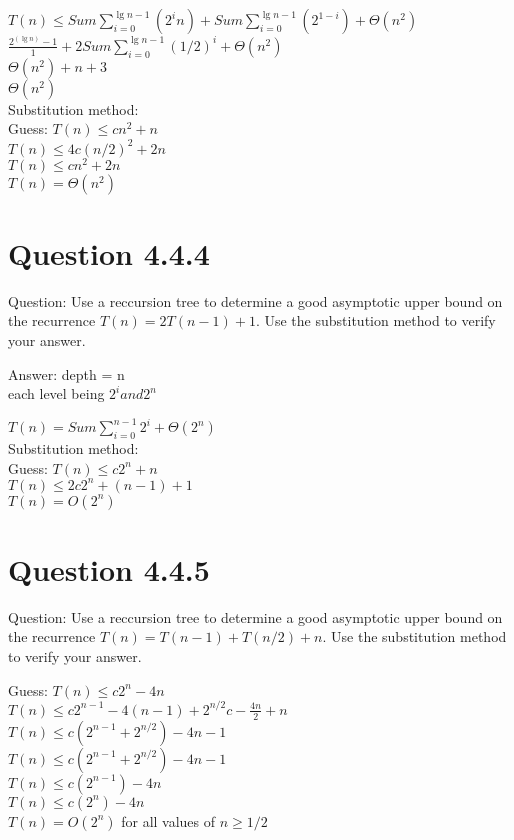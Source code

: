 \documentclass[12pt]{article}
\begin{document}
$ T(n)\le Sum \sum_{i=0}^{\lg n-1} (2^i n) + Sum \sum_{i=0}^{\lg n-1} (2 ^{1-i})+ \Theta(n^2) 	$ \\

$\frac{2^(\lg n)-1 }{1} + 2 Sum \sum_{i=0}^{\lg n-1} (1/2)^i + \Theta(n^2) $\\

$\Theta(n^2) + n + 3 $\\
$\Theta(n^2) $\\

Substitution method: \\
Guess: $T(n) \le cn^2 + n$ \\

$ T(n) \le 4c(n/2)^2 + 2n$\\


$ T(n) \le cn^2 + 2n$\\

$ T(n) =\Theta(n^2) $ \\


\section{Question 4.4.4}

Question: Use a reccursion tree to determine a good asymptotic upper bound on the recurrence $T(n) = 2T(n - 1) + 1$. Use the substitution method to verify your answer.

Answer: depth = n \\
each level being $2^i and 2^n$

$ T(n) = Sum \sum_{i=0}^{n-1} 2^i + \Theta(2^n) 	$ \\
Substitution method: \\
Guess: $ T(n) \le c2^n + n$\\
$ T(n) \le 2c2^n + (n-1) +1$ \\
$T(n) = O(2^n)$ 


\section{Question 4.4.5}

Question: Use a reccursion tree to determine a good asymptotic upper bound on the recurrence $T(n) = T(n - 1) + T(n / 2) + n$. Use the substitution method to verify your answer.

Guess: 
$ T(n) \le c2^n - 4n$ \\

$ T(n) \le c2^{n-1} - 4(n-1) + 2^{n/2}c - \frac{4n}{2} + n $\\
$ T(n) \le c(2^{n-1}+ 2^{n/2}) - 4n -1$\\
$ T(n) \le c(2^{n-1}+ 2^{n/2}) - 4n -1$\\ 
$ T(n) \le c(2^{n-1}) - 4n$ \\
$ T(n) \le c(2^n)-4n$\\
$T(n) = O(2^n)$
for all values of $n \ge 1/2$
\end{document}
